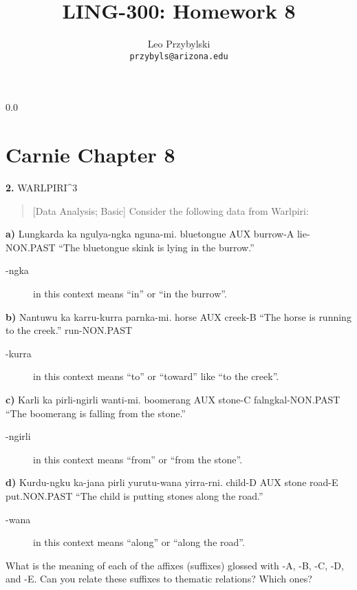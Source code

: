 \documentclass[11pt,notitlepage]{article}
\title{LING-300: Homework 8}
\author{Leo Przybylski\\
\texttt{przybyls@arizona.edu}}
\newcommand{\question}[2]{\textbf{#1.} #2}
\newcommand{\subquestion}[2]{\par\hspace{0.5cm} \textbf{#1)} #2}
\begin{document}
  \maketitle
  {\setlength{\baselineskip}%
           {0.0\baselineskip}
  \section*{Carnie Chapter 8}
  \hrulefill \par}

\question{2}{WARLPIRI^3}
\begin{quote}[Data Analysis; Basic]
Consider the following data from Warlpiri:
\end{quote}

\subquestion{a}{Lungkarda ka ngulya-ngka nguna-mi. bluetongue AUX
  burrow-A lie-NON.PAST “The bluetongue skink is lying in the
  burrow.”}

\begin{description}
  \item [-ngka] in this context means ``in'' or ``in the burrow''.
\end{description}

\subquestion{b}{Nantuwu ka karru-kurra parnka-mi.}
horse AUX creek-B
“The horse is running to the creek.”
run-NON.PAST

\begin{description}
  \item [-kurra] in this context means ``to'' or ``toward'' like ``to
    the creek''.
\end{description}

\subquestion{c}{Karli ka pirli-ngirli wanti-mi. boomerang AUX stone-C falngkal-NON.PAST “The boomerang is falling from the stone.”}

\begin{description}
  \item [-ngirli] in this context means ``from'' or ``from the stone''.
\end{description}

\subquestion{d}{Kurdu-ngku ka-jana pirli yurutu-wana yirra-rni. child-D AUX stone road-E put.NON.PAST “The child is putting stones along the road.”}

\begin{description}
  \item [-wana] in this context means ``along'' or ``along the road''.
\end{description}


What is the meaning of each of the affixes (suffixes) glossed with -A,
-B, -C, -D, and -E. Can you relate these suffixes to thematic
relations? Which ones?
\end{document}
